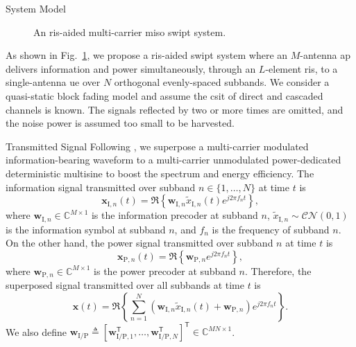 \begin{section}{System Model}\label{se:system_model}
	\begin{figure}[H]
		\centering
		\def\svgwidth{0.9\columnwidth}
		
		\caption{An \gls{ris}-aided multi-carrier \gls{miso} \gls{swipt} system.}
		\label{fi:system}
	\end{figure}

	As shown in Fig.~\ref{fi:system}, we propose a \gls{ris}-aided \gls{swipt} system where an $M$-antenna \gls{ap} delivers information and power simultaneously, through an $L$-element \gls{ris}, to a single-antenna \gls{ue} over $N$ orthogonal evenly-spaced subbands. We consider a quasi-static block fading model and assume the \gls{csit} of direct and cascaded channels is known. The signals reflected by two or more times are omitted, and the noise power is assumed too small to be harvested.


	\begin{subsection}{Transmitted Signal}
		Following \cite{Clerckx2018b}, we superpose a multi-carrier modulated information-bearing waveform to a multi-carrier unmodulated power-dedicated deterministic multisine to boost the spectrum and energy efficiency. The information signal transmitted over subband $n \in \{1, \dots, N\}$ at time $t$ is
		\begin{equation}
			\mathbf{x}_{\mathrm{I},n}(t) = \Re\left\{\mathbf{w}_{\mathrm{I},n} \tilde{x}_{\mathrm{I},n}(t) e^{j2{\pi}{f_n}{t}}\right\},
		\end{equation}
		where $\mathbf{w}_{\mathrm{I},n} \in \mathbb{C}^{M \times 1}$ is the information precoder at subband $n$, $\tilde{x}_{\mathrm{I},n}\sim\mathcal{CN}(0,1)$ is the information symbol at subband $n$, and $f_n$ is the frequency of subband $n$. On the other hand, the power signal transmitted over subband $n$ at time $t$ is
		\begin{equation}
			\mathbf{x}_{\mathrm{P},n}(t) = \Re\left\{\mathbf{w}_{\mathrm{P},n} e^{j2{\pi}{f_n}{t}}\right\},
		\end{equation}
		where $\mathbf{w}_{\mathrm{P},n} \in \mathbb{C}^{M \times 1}$ is the power precoder at subband $n$. Therefore, the superposed signal transmitted over all subbands at time $t$ is
		\begin{equation}
			\mathbf{x}(t) = \Re{\left\{\sum_{n=1}^N(\mathbf{w}_{\mathrm{I},n}\tilde{x}_{\mathrm{I},n}(t)+\mathbf{w}_{\mathrm{P},n}){e^{j2{\pi}{f_n}{t}}}\right\}}.
		\end{equation}
		We also define $\mathbf{w}_{\mathrm{I/P}} \triangleq [\mathbf{w}_{\mathrm{I/P},1}^\mathsf{T},\dots,\mathbf{w}_{\mathrm{I/P},N}^\mathsf{T}]^\mathsf{T} \in \mathbb{C}^{MN \times 1}$.
	\end{subsection}



\end{section}
